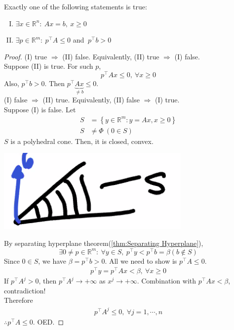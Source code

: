 \documentclass[11pt]{article}
\numberwithin{equation}{section}
\begin{document}
    \begin{lemma}\label{lm:farkas}
        Exactly one of the following statements is true:
        \begin{enumerate}[I)]
            \item $\exists x \in \mathbb{R}^{n}: \ Ax=b, \ x \geq 0$
            \item $\exists p \in \mathbb{R}^{m}: \ p^\top A \leq 0 $ and $ \ p^\top b >0$
        \end{enumerate}
        \begin{proof}
            (I) true $\Longrightarrow$ (II) false. 
            Equivalently, (II) true $\Longrightarrow$ (I) false.\\
            Suppose (II) is true. For such $p$,
            $$p^\top Ax \leq 0, \ \forall x \geq 0$$
            Also, $p^{\top} b>0$. Then $p^{\top} \underbrace{Ax}_{\neq b} \leq 0$.\\
            (I) false $\Longrightarrow$ (II) true. 
            Equivalently, (II) false $\Longrightarrow$ (I) true.\\
            Suppose (I) is false.
            Let \begin{align*}
                S&=\left\{y \in \mathbb{R}^{m}: y=A x, x \geqslant 0\right\} \\
                S&\neq \Phi \ (0 \in S)
            \end{align*}
            $S$ is a polyhedral cone. Then, it is closed, convex.

            \begin{center}
                \includegraphics[scale=0.5]{images/5-pr-1.png}
            \end{center}

            By separating hyperplane theorem(\ref{thm:Separating Hyperplane}), 
            $$\exists 0 \neq p \in \mathbb{R}^{m}: \ \forall y \in S,\  p^\top y < p^\top b =\beta (b \notin S) $$
            Since $0 \in S$, we have $\beta = p^\top b > 0$. All we need to show is $p^\top A \leq 0$. 
            \begin{align*}
                p^\top y = p^\top Ax <\beta,\  \forall x \geq 0
            \end{align*}
            If $p^\top A^j >0 $, then $p^\top A^j \rightarrow +\infty$ as $x^j \rightarrow +\infty$. Combination with $p^\top Ax <\beta$, contradiction! \\
            Therefore \begin{align*}
                p^\top A^j \leq 0, \ \forall j=1,\cdots, n
            \end{align*}
            $\therefore p^{\top} A \leq 0$. OED.
        \end{proof}
    \end{lemma}
    
\end{document}
